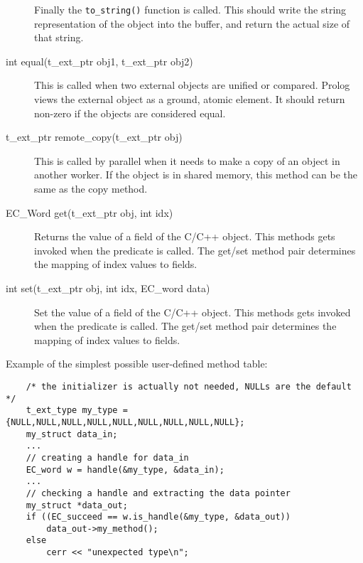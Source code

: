 \begin{description}
Finally  the \verb.to_string(). function is called. This should write the
string representation of the object into the buffer, and return the actual
size of that string.

\item[int equal(t_ext_ptr obj1, t_ext_ptr obj2)]
This is called when two external objects are unified or compared.
Prolog views the external object as a ground, atomic element.
It should return non-zero if the objects are considered equal.

\item[t_ext_ptr remote_copy(t_ext_ptr obj)]
This is called by parallel {\eclipse} when it needs to make a copy of an
object in another worker. If the object is in shared memory, this method
can be the same as the copy method.

\item[EC_Word get(t_ext_ptr obj, int idx)]
Returns the value of a field of the C/C++ object.
This methods gets invoked when the {\eclipse} predicate  is called.
The get/set method pair determines the mapping of index values to fields.

\item[int set(t_ext_ptr obj, int idx, EC_word data)]
Set the value of a field of the C/C++ object.
This methods gets invoked when the {\eclipse} predicate  is called.
The get/set method pair determines the mapping of index values to fields.
\end{description}

Example of the simplest possible user-defined method table:
\begin{verbatim}
    /* the initializer is actually not needed, NULLs are the default */
    t_ext_type my_type = {NULL,NULL,NULL,NULL,NULL,NULL,NULL,NULL,NULL};
    my_struct data_in;
    ...
    // creating a handle for data_in
    EC_word w = handle(&my_type, &data_in);
    ...
    // checking a handle and extracting the data pointer
    my_struct *data_out;
    if ((EC_succeed == w.is_handle(&my_type, &data_out))
        data_out->my_method();
    else
        cerr << "unexpected type\n";
\end{verbatim}



